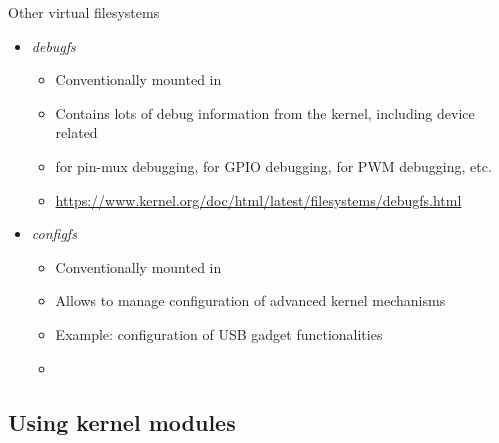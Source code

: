 \begin{frame}{Other virtual filesystems}

  \begin{itemize}

  \item {\em debugfs}
    \begin{itemize}
    \item Conventionally mounted in 
    \item Contains lots of debug information from the kernel,
      including device related
    \item {} for pin-mux debugging,
       for GPIO debugging,
       for PWM debugging, etc.
    \item \url{https://www.kernel.org/doc/html/latest/filesystems/debugfs.html}
    \end{itemize}
  \item {\em configfs}
    \begin{itemize}
    \item Conventionally mounted in 
    \item Allows to manage configuration of advanced kernel mechanisms
    \item Example: configuration of USB gadget functionalities
    \item {}
    \end{itemize}
  \end{itemize}
\end{frame}

\subsection{Using kernel modules}

